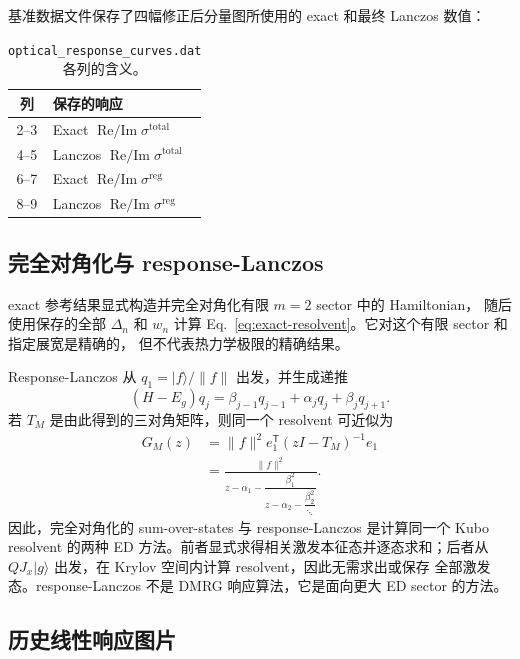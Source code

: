 \documentclass[11pt]{article}
\begin{document}
基准数据文件保存了四幅修正后分量图所使用的 exact 和最终 Lanczos 数值：
\begin{table}[H]
\centering
\small
\caption{\texttt{optical\_response\_curves.dat} 各列的含义。}
\begin{tabular}{cl}
\toprule
列 & 保存的响应 \\
\midrule
2--3 & Exact \(\operatorname{Re/Im}\sigma^{\mathrm{total}}\) \\
4--5 & Lanczos \(\operatorname{Re/Im}\sigma^{\mathrm{total}}\) \\
6--7 & Exact \(\operatorname{Re/Im}\sigma^{\mathrm{reg}}\) \\
8--9 & Lanczos \(\operatorname{Re/Im}\sigma^{\mathrm{reg}}\) \\
\bottomrule
\end{tabular}
\end{table}

\subsection{完全对角化与 response-Lanczos}

exact 参考结果显式构造并完全对角化有限 \(m=2\) sector 中的 Hamiltonian，
随后使用保存的全部 \(\Delta_n\) 和 \(w_n\) 计算
Eq.~\eqref{eq:exact-resolvent}。它对这个有限 sector 和指定展宽是精确的，
但不代表热力学极限的精确结果。

Response-Lanczos 从 \(q_1=\lvert f\rangle/\lVert f\rVert\) 出发，并生成递推
\begin{equation}
  (H-E_g)q_j
  =\beta_{j-1}q_{j-1}+\alpha_jq_j+\beta_jq_{j+1}.
  \label{eq:response-lanczos-recurrence}
\end{equation}
若 \(T_M\) 是由此得到的三对角矩阵，则同一个 resolvent 可近似为
\begin{align}
  G_M(z)
  &=\lVert f\rVert^2 e_1^{\mathsf T}(zI-T_M)^{-1}e_1 \\
  &=\frac{\lVert f\rVert^2}
  {z-\alpha_1-\dfrac{\beta_1^2}
  {z-\alpha_2-\dfrac{\beta_2^2}{\ddots}}}.
  \label{eq:lanczos-continued-fraction}
\end{align}
因此，完全对角化的 sum-over-states 与 response-Lanczos 是计算同一个 Kubo
resolvent 的两种 ED 方法。前者显式求得相关激发本征态并逐态求和；后者从
\(QJ_x\lvert g\rangle\) 出发，在 Krylov 空间内计算 resolvent，因此无需求出或保存
全部激发态。response-Lanczos 不是 DMRG 响应算法，它是面向更大 ED sector 的方法。

\subsection{历史线性响应图片}
\end{document}
